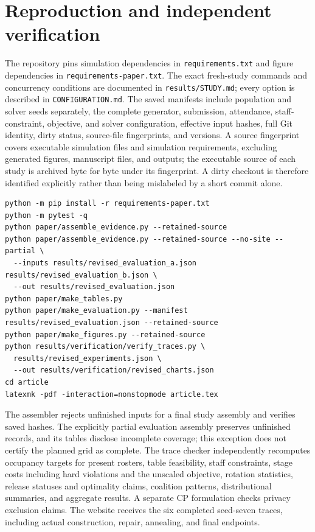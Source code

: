 \documentclass[11pt,a4paper]{article}
\theoremstyle{definition}\newtheorem{definition}[theorem]{Definition}
\theoremstyle{remark}\newtheorem{remark}[theorem]{Remark}
\begin{document}
\section{Reproduction and independent verification}
The repository pins simulation dependencies in \texttt{requirements.txt} and figure dependencies in \texttt{requirements-paper.txt}. The exact fresh-study commands and concurrency conditions are documented in \texttt{results/STUDY.md}; every option is described in \texttt{CONFIGURATION.md}. The saved manifests include population and solver seeds separately, the complete generator, submission, attendance, staff-constraint, objective, and solver configuration, effective input hashes, full Git identity, dirty status, source-file fingerprints, and versions. A source fingerprint covers executable simulation files and simulation requirements, excluding generated figures, manuscript files, and outputs; the executable source of each study is archived byte for byte under its fingerprint. A dirty checkout is therefore identified explicitly rather than being mislabeled by a short commit alone.

\begin{lstlisting}[basicstyle=\ttfamily\footnotesize,breaklines=true]
python -m pip install -r requirements-paper.txt
python -m pytest -q
python paper/assemble_evidence.py --retained-source
python paper/assemble_evidence.py --retained-source --no-site --partial \
  --inputs results/revised_evaluation_a.json results/revised_evaluation_b.json \
  --out results/revised_evaluation.json
python paper/make_tables.py
python paper/make_evaluation.py --manifest results/revised_evaluation.json --retained-source
python paper/make_figures.py --retained-source
python results/verification/verify_traces.py \
  results/revised_experiments.json \
  --out results/verification/revised_charts.json
cd article
latexmk -pdf -interaction=nonstopmode article.tex
\end{lstlisting}
The assembler rejects unfinished inputs for a final study assembly and verifies saved hashes. The explicitly partial evaluation assembly preserves unfinished records, and its tables disclose incomplete coverage; this exception does not certify the planned grid as complete. The trace checker independently recomputes occupancy targets for present rosters, table feasibility, staff constraints, stage costs including hard violations and the unscaled objective, rotation statistics, release statuses and optimality claims, coalition patterns, distributional summaries, and aggregate results. A separate CP formulation checks privacy exclusion claims. The website receives the six completed seed-seven traces, including actual construction, repair, annealing, and final endpoints.
\end{document}
